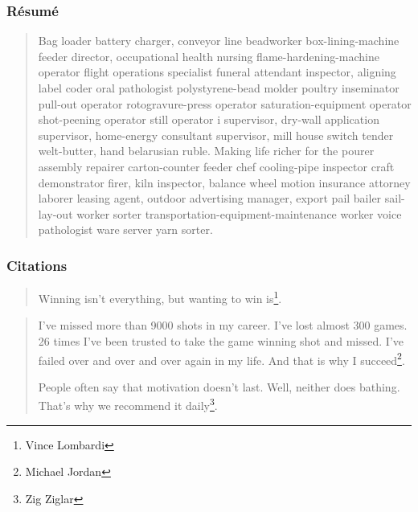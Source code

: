 \documentclass[aspectratio=1610,compress,t,english,french]{beamer}
\begin{document}
\begin{frame}
	\frametitle{Résumé}
	
	\begin{abstract}
		Bag loader battery charger, conveyor line beadworker box-lining-machine feeder director, occupational health nursing flame-hardening-machine operator flight operations specialist funeral attendant inspector, aligning label coder oral pathologist polystyrene-bead molder poultry inseminator pull-out operator rotogravure-press operator saturation-equipment operator shot-peening operator still operator i supervisor, dry-wall application supervisor, home-energy consultant supervisor, mill house switch tender welt-butter, hand belarusian ruble. Making life richer for the pourer assembly repairer carton-counter feeder chef cooling-pipe inspector craft demonstrator firer, kiln inspector, balance wheel motion insurance attorney laborer leasing agent, outdoor advertising manager, export pail bailer sail-lay-out worker sorter transportation-equipment-maintenance worker voice pathologist ware server yarn sorter.
	\end{abstract}
\end{frame}

\begin{frame}
	\frametitle{Citations}
	
	\begin{quote}
		Winning isn’t everything, but wanting to win is\footnote{Vince Lombardi}.
	\end{quote}

	\begin{quotation}
		I've missed more than 9000 shots in my career. I've lost almost 300 games. 26 times I've been trusted to take the game winning shot and missed. I've failed over and over and over again in my life. And that is why I succeed\footnote{Michael Jordan}.
		
		People often say that motivation doesn’t last. Well, neither does bathing.  That’s why we recommend it daily\footnote{Zig Ziglar}.
	\end{quotation}
\end{frame}
\end{document}
